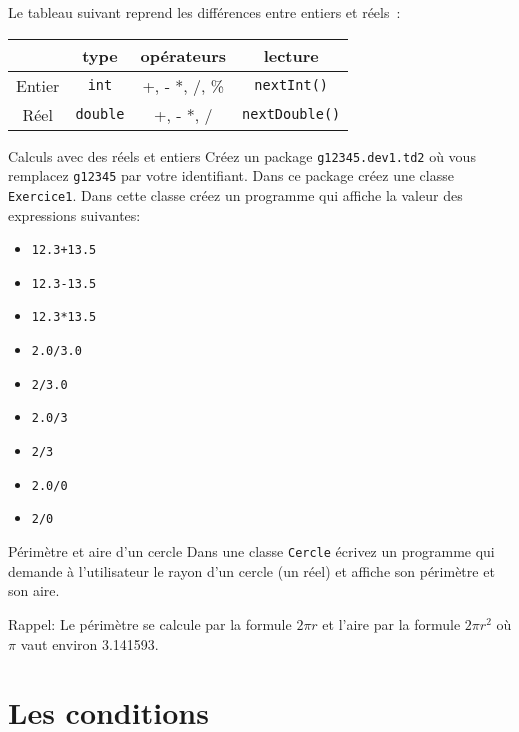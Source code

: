 \documentclass[a4paper,11pt]{article}
\begin{document}
	Le tableau suivant reprend les différences entre entiers et réels~:
	\begin{center}
		\begin{tabular}{| c | c | c | c |}
			\hline
			& type & opérateurs & lecture \\
			\hline
			Entier & \texttt{int} & +, - *, /, \% & \texttt{nextInt()} \\
			Réel & \texttt{double} & +, - *, / & \texttt{nextDouble()} \\
			\hline			
		\end{tabular}
	\end{center}

\begin{Exercice}{Calculs avec des réels et entiers}
	Créez un package \texttt{g12345.dev1.td2} où vous remplacez \texttt{g12345} par votre identifiant.
	Dans ce package créez une classe \texttt{Exercice1}.
	Dans cette classe créez un programme qui affiche la valeur des expressions suivantes:
	
	\begin{itemize}		
		\item \texttt{12.3+13.5}
		\item \texttt{12.3-13.5}
		\item \texttt{12.3*13.5}
		\item \texttt{2.0/3.0}
		\item \texttt{2/3.0}
		\item \texttt{2.0/3}
		\item \texttt{2/3}
		\item \texttt{2.0/0}
		\item \texttt{2/0}
	\end{itemize}
\end{Exercice}

\begin{Exercice}{Périmètre et aire d'un cercle}
	Dans une classe \texttt{Cercle} écrivez un programme
	qui demande à l'utilisateur le rayon d'un cercle (un réel)
	et affiche son périmètre et son aire.
	
	Rappel: Le périmètre se calcule par la formule $2\pi r$ et 
	l'aire par la formule $2 \pi r^2$ où $\pi$ vaut environ 3.141593.
\end{Exercice}



\section{Les conditions}
\end{document}
